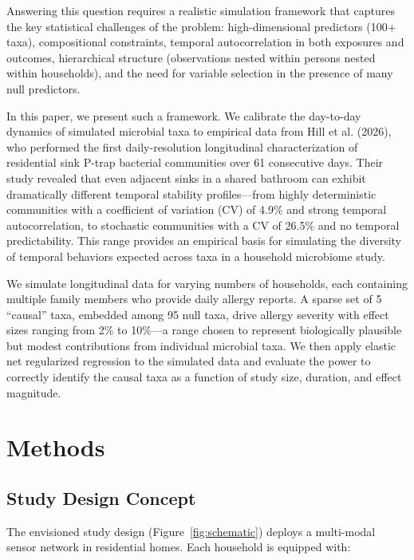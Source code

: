 \documentclass[11pt,letterpaper]{article}
\begin{document}
Answering this question requires a realistic simulation framework that captures the key statistical challenges of the problem: high-dimensional predictors (100+ taxa), compositional constraints, temporal autocorrelation in both exposures and outcomes, hierarchical structure (observations nested within persons nested within households), and the need for variable selection in the presence of many null predictors.

In this paper, we present such a framework. We calibrate the day-to-day dynamics of simulated microbial taxa to empirical data from Hill et al. (2026), who performed the first daily-resolution longitudinal characterization of residential sink P-trap bacterial communities over 61 consecutive days. Their study revealed that even adjacent sinks in a shared bathroom can exhibit dramatically different temporal stability profiles---from highly deterministic communities with a coefficient of variation (CV) of 4.9\% and strong temporal autocorrelation, to stochastic communities with a CV of 26.5\% and no temporal predictability. This range provides an empirical basis for simulating the diversity of temporal behaviors expected across taxa in a household microbiome study.

We simulate longitudinal data for varying numbers of households, each containing multiple family members who provide daily allergy reports. A sparse set of 5 ``causal'' taxa, embedded among 95 null taxa, drive allergy severity with effect sizes ranging from 2\% to 10\%---a range chosen to represent biologically plausible but modest contributions from individual microbial taxa. We then apply elastic net regularized regression to the simulated data and evaluate the power to correctly identify the causal taxa as a function of study size, duration, and effect magnitude.

\section{Methods}

\subsection{Study Design Concept}

The envisioned study design (Figure~\ref{fig:schematic}) deploys a multi-modal sensor network in residential homes. Each household is equipped with:
\end{document}
